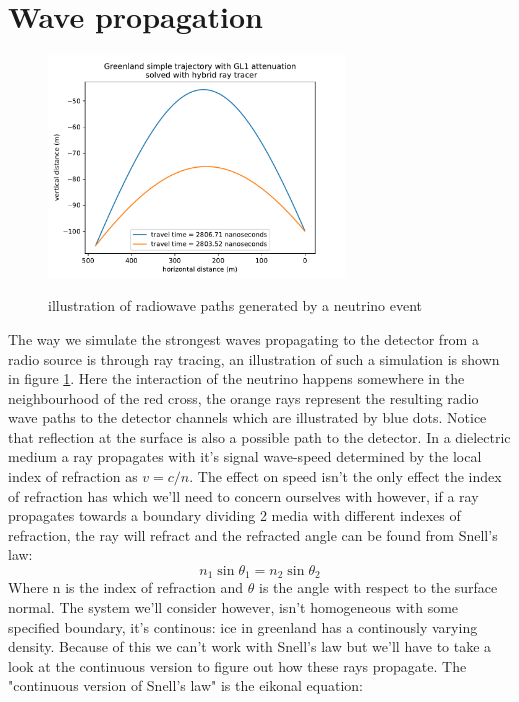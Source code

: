 \documentclass[11pt,a4paper,faculty=we,language=en,doctype=report]{cls/ugent-doc}
\begin{document}
\section{Wave propagation}
\begin{figure}[h!]
	\centering
	\includegraphics[width=0.7\textwidth]{path_illustration.pdf}
	\label{fig:PathIllu}
	\caption{illustration of radiowave paths generated by a neutrino event}
\end{figure}
The way we simulate the strongest waves propagating to the detector from a
radio source is through ray tracing, an illustration of such a simulation is
shown in figure \ref{fig:PathIllu}.  Here the interaction of the neutrino
happens somewhere in the neighbourhood of the red cross, the orange rays
represent the resulting radio wave paths to the detector channels which are
illustrated by blue dots. Notice that reflection at the surface is also a
possible path to the detector.  In a dielectric medium a ray propagates with
it's signal wave-speed determined by the local index of refraction as $v =
c/n$.   The effect on speed isn't the only effect the index of
refraction has which we'll need to concern ourselves with however, if a ray
propagates towards a boundary dividing 2 media with different indexes of
refraction, the ray will refract and the refracted angle can be found from
Snell's law:
\begin{equation}
	n_1\sin{\theta_1} = n_2\sin{\theta_2}
\end{equation}
Where n is the index of refraction and $\theta$ is the angle
with respect to the surface normal.
The system we'll consider however, isn't 
homogeneous with some specified boundary, it's continous: ice
in greenland has a continously varying density. 
Because of this we can't work with Snell's law but we'll have to 
take a look at the continuous version
to figure out how these rays propagate. 
The "continuous version of Snell's law" is the eikonal equation:
\end{document}

